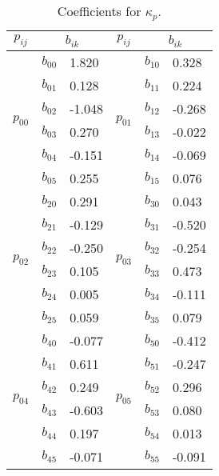 \begin{table}
	\centering
	\caption{Coefficients for $\kappa_p$.}
	\label{T:T1}
	\begin{tabular}{@{}cll|cll@{}}
		\hline
		$p_{ij}$                  & \multicolumn{2}{c}{$b_{ik}$} & $p_{ij}$ & \multicolumn{2}{c}{$b_{ik}$}\\
		\hline
		\multirow{6}{*}{$p_{00}$} & $b_{00}$  & 1.820 &   \multirow{6}{*}{$p_{01}$} & $b_{10}$ & 0.328 \\ %
		& $b_{01}$      & 0.128   &  	& $b_{11}$      & 0.224 \\ %
		& $b_{02}$      & -1.048   &	& $b_{12}$      & -0.268 \\ %
		& $b_{03}$      & 0.270   &	& $b_{13}$      & -0.022 \\ %
		& $b_{04}$      & -0.151  & 	& $b_{14}$      & -0.069  \\ %
		& $b_{05}$      & 0.255   &	& $b_{15}$      & 0.076    \\ \hline
		\multirow{6}{*}{$p_{02}$} & $b_{20}$  & 0.291	& \multirow{6}{*}{$p_{03}$} & $b_{30}$ & 0.043 \\ %
		& $b_{21}$      & -0.129   & & $b_{31}$      & -0.520  \\ %
		& $b_{22}$      & -0.250   & & $b_{32}$      & -0.254  \\ %
		& $b_{23}$      & 0.105    & & $b_{33}$      & 0.473   \\ %
		& $b_{24}$      & 0.005  & & $b_{34}$      & -0.111  \\ %
		& $b_{25}$      & 0.059   & & $b_{35}$      & 0.079  \\ \hline
		\multirow{6}{*}{$p_{04}$} & $b_{40}$      & -0.077  & \multirow{6}{*}{$p_{05}$} & $b_{50}$      & -0.412   \\ %
		& $b_{41}$      & 0.611     &  & $b_{51}$      & -0.247\\ %
		& $b_{42}$      & 0.249     &  & $b_{52}$      & 0.296\\ %
		& $b_{43}$      & -0.603    &  & $b_{53}$      & 0.080\\ %
		& $b_{44}$      & 0.197     &  & $b_{54}$      & 0.013\\ %
		& $b_{45}$      & -0.071   &  & $b_{55}$      & -0.091\\
		\hline
	\end{tabular}
\end{table}

